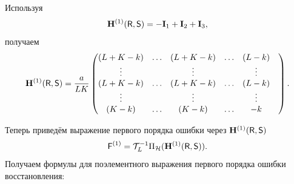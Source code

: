 \documentclass[specialist,
               substylefile = spbu.rtx,
               subf,href,colorlinks=true, 12pt]{disser}
\begin{document}
Используя
$$\mathbf{H}^{(1)}(\textsf{R}, \textsf{S}) = -\mathbf{I}_1 + \mathbf{I}_2 + \mathbf{I}_3,$$
получаем
$$\mathbf{H}^{(1)}(\textsf{R}, \textsf{S}) = \frac{a}{LK}\begin{pmatrix}
	(L + K - k) & \ldots & (L + K - k) & \ldots & (L - k)\\
	\vdots & & \vdots & & \vdots \\
	(L + K - k) & \ldots & (L + K - k) & \ldots & (L - k) & \\
	\vdots & & \vdots & & \vdots \\
	(K - k) & \ldots & (K - k) & \ldots & -k \\
\end{pmatrix}.$$

Теперь приведём выражение первого порядка ошибки через $\mathbf{H}^{(1)}(\textsf{R}, \textsf{S})$
$$\textsf{F}^{(1)} = \mathcal{T}_L^{-1} \Pi_{\mathcal{H}}(\mathbf{H}^{(1)}(\textsf{R}, \textsf{S})).$$
Получаем формулы для поэлементного выражения первого порядка ошибки восстановления:
\end{document}
